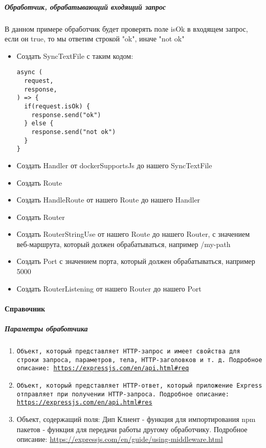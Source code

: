 \documentclass{article}
\begin{document}
\subparagraph{Обработчик, обрабатывающий входящий запрос}
В данном примере обработчик будет проверять поле isOk в входящем запрос, если
он true, то мы ответим строкой "ok", иначе "not ok"
\begin{itemize}
  \item Создать SyncTextFile с таким кодом:
        \begin{lstlisting}
async (
  request,
  response,
) => {
  if(request.isOk) {
    response.send("ok") 
  } else {
    response.send("not ok")
  }
}
\end{lstlisting}
  \item Создать Handler от dockerSupportsJs до нашего SyncTextFile
  \item Создать Route
  \item Создать HandleRoute от нашего Route до нашего Handler
  \item Создать Router
  \item Создать RouterStringUse от нашего Route до нашего Router, с значением
        веб-маршрута, который должен обрабатываться, например /my-path
  \item Создать Port с значением порта, который должен обрабатываться, например
        5000
  \item Создать RouterListening от нашего Router до нашего Port
\end{itemize}

\paragraph{Справочник}
\subparagraph{Параметры обработчика}
\begin{enumerate}
  \item \texttt{Объект, который представляет HTTP-запрос и имеет свойства для
          строки запроса, параметров, тела, HTTP-заголовков и т. д. Подробное
          описание:
          \url{https://expressjs.com/en/api.html#req}}
  \item \texttt{Объект, который представляет HTTP-ответ, который приложение
          Express отправляет при получении HTTP-запроса. Подробное описание:
          \url{https://expressjs.com/en/api.html#res}}
  \item Объект, содержащий поля:
         Дип Клиент
         - функция для импортирования npm пакетов
         - функция для передачи работы другому обработчику.
        Подробное описание:
        \url{https://expressjs.com/en/guide/using-middleware.html}
\end{enumerate}
\end{document}
